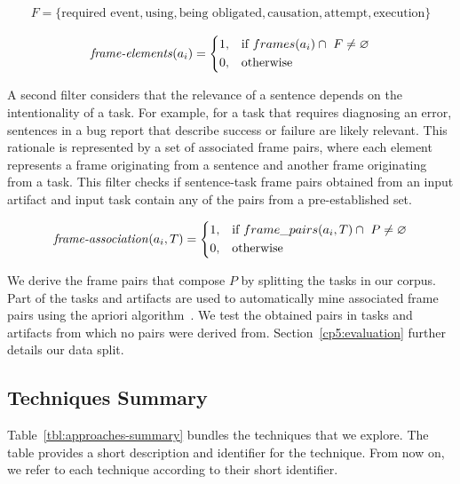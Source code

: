 \begin{equation}
\begin{split}
F = \{ \text{required event}, \text{using}, \text{being obligated}, \text{causation}, \text{attempt}, \text{execution} \} 
\end{split}
\end{equation}





\begin{equation}
\text{\textit{frame-elements}}(a_i) = \left \{
\begin{aligned}
    &1, && \text{if}\ frames(a_i) \cap ~F \ne \emptyset \\
    &0, && \text{otherwise}
\end{aligned} \right.
\end{equation} 


\medskip
A second filter considers that the relevance of a sentence depends on the intentionality of a task. 
For example, for a task that requires diagnosing an error, sentences in a bug report that describe success or failure are likely relevant. 
This rationale is represented by a set of associated frame pairs, where each element represents a frame originating from a sentence and another frame originating from a task.
This filter checks if sentence-task frame pairs obtained from an input artifact and input task contain any of the pairs from a pre-established set.




\begin{equation}
\text{\textit{frame-association}}(a_i, T) = \left \{
\begin{aligned}
    &1, && \text{if}\ frame\_pairs(a_i, T) \cap ~P \ne \emptyset \\
    &0, && \text{otherwise}
\end{aligned} \right.
\end{equation} 

\smallskip
We derive the frame pairs that compose $P$ by splitting the tasks in our corpus. Part of the tasks and artifacts are used to automatically
mine associated frame pairs using the apriori algorithm~\cite{agrawal1994apriori}. We test the obtained pairs in tasks and artifacts from which no pairs were derived from. 
Section~\ref{cp5:evaluation} further details our data split.









\subsection{Techniques Summary}


Table~\ref{tbl:approaches-summary} bundles the techniques that we explore.
The table provides a short description and identifier for the technique. From now on, we refer to each technique according to their short identifier.


